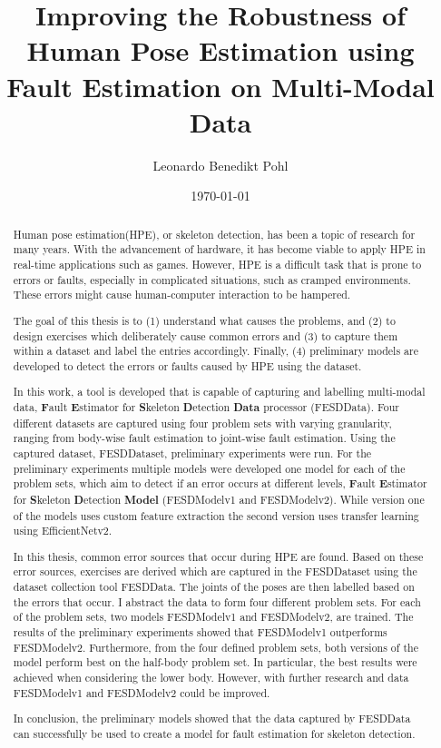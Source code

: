 
\title{Improving the Robustness of Human Pose Estimation using Fault Estimation on Multi-Modal Data}
\author{Leonardo Benedikt Pohl}
\date{\today}
 
\newlength{\originalVOffset}
\newlength{\originalHOffset}
\setlength{\originalVOffset}{\voffset}   
\setlength{\originalHOffset}{\hoffset}

\setlength{\voffset}{0cm}
\setlength{\hoffset}{0cm}

\setlength{\voffset}{\originalVOffset}
\setlength{\hoffset}{\originalHOffset}

\clearpage

\begin{abstract}
  Human pose estimation(HPE), or skeleton detection, has been a topic of research for many years. With the advancement of hardware, it has become viable to apply HPE in real-time applications such as games. However, HPE is a difficult task that is prone to errors or faults, especially in complicated situations, such as cramped environments. These errors might cause human-computer interaction to be hampered.

  The goal of this thesis is to (1) understand what causes the problems, and (2) to design exercises which deliberately cause common errors and (3) to capture them within a dataset and label the entries accordingly. Finally, (4) preliminary models are developed to detect the errors or faults caused by HPE using the dataset.

  In this work, a tool is developed that is capable of capturing and labelling multi-modal data, \textbf{F}ault \textbf{E}stimator for \textbf{S}keleton \textbf{D}etection \textbf{Data} processor (FESDData). Four different datasets are captured using four problem sets with varying granularity, ranging from body-wise fault estimation to joint-wise fault estimation. Using the captured dataset, FESDDataset, preliminary experiments were run. For the preliminary experiments multiple models were developed one model for each of the problem sets, which aim to detect if an error occurs at different levels, \textbf{F}ault \textbf{E}stimator for \textbf{S}keleton \textbf{D}etection \textbf{Model} (FESDModelv1 and FESDModelv2). While version one of the models uses custom feature extraction the second version uses transfer learning using EfficientNetv2.

  In this thesis, common error sources that occur during HPE are found. Based on these error sources, exercises are derived which are captured in the FESDDataset using the dataset collection tool FESDData. The joints of the poses are then labelled based on the errors that occur. I abstract the data to form four different problem sets. For each of the problem sets, two models FESDModelv1 and FESDModelv2, are trained. The results of the preliminary experiments showed that FESDModelv1 outperforms FESDModelv2. Furthermore, from the four defined problem sets, both versions of the model perform best on the half-body problem set. In particular, the best results were achieved when considering the lower body. However, with further research and data FESDModelv1 and FESDModelv2 could be improved.

In conclusion, the preliminary models showed that the data captured by FESDData can successfully be used to create a model for fault estimation for skeleton detection.

\end{abstract}
